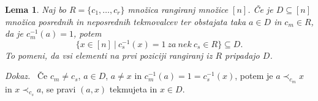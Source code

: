 \documentclass[a4paper, 12pt]{book}
\newtheorem{lema}{Lema}[chapter]
\newenvironment{dokaz}{\emph{Dokaz.}\ }{\hspace{\fill}{$\Box$}}
\begin{document}
\begin{lema}
\label{lema_algoritem_posredni_tekmovalci_2}
    Naj bo $R = \{ c_1, \dots, c_r \}$ množica rangiranj množice $[n]$. Če je $D \subseteq [n]$ množica posrednih in neposrednih tekmovalcev ter obstajata taka $a \in D$ in  $c_m \in R$, da je $c_m^{-1}(a) = 1$, potem 
    \[
        \{ x \in [n] \ | \ c_s^{-1}(x) = 1 \ za \ nek \ c_s \in R \} \subseteq D.    
    \]
    To pomeni, da vsi elementi na prvi poziciji rangiranj iz $R$ pripadajo $D$.
\end{lema}
\begin{dokaz}
    Če $c_m \neq c_s$, $a \in D$, $a \neq x$ in $c_m^{-1}(a) = 1 = c_s^{-1}(x)$, potem je $a \prec_{c_m} x$ in $x \prec_{c_s} a$, se pravi $(a, x)$ tekmujeta in $x \in D$. 
\end{dokaz}
\end{document}
